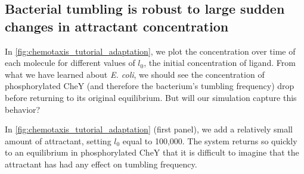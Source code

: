 \FloatBarrier
{}
\subsection{Bacterial tumbling is robust to large sudden changes in attractant concentration}

In \autoref{fig:chemotaxis_tutorial_adaptation}, we plot the concentration over time of each molecule for different values of $l_0$, the initial concentration of ligand. From what we have learned about \textit{E. coli}, we should see the concentration of phosphorylated CheY (and therefore the bacterium's tumbling frequency) drop before returning to its original equilibrium. But will our simulation capture this behavior?

In \autoref{fig:chemotaxis_tutorial_adaptation} (first panel), we add a relatively small amount of attractant, setting $l_0$ equal to 100,000. The system returns so quickly to an equilibrium in phosphorylated CheY that it is difficult to imagine that the attractant has had any effect on tumbling frequency.

